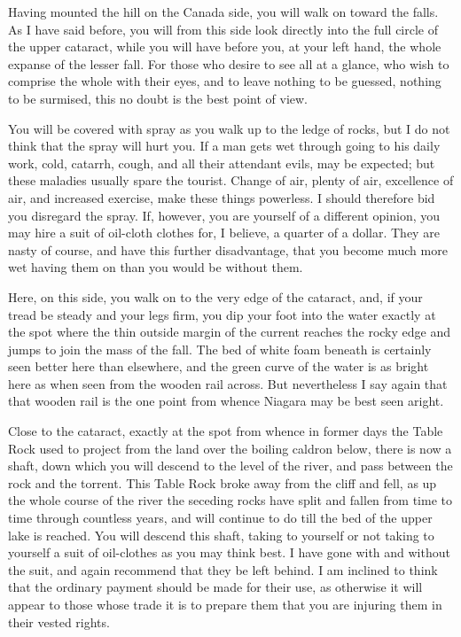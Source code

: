 Having mounted the hill on the Canada side, you will walk on toward
the falls.  As I have said before, you will from this side look
directly into the full circle of the upper cataract, while you will
have before you, at your left hand, the whole expanse of the lesser
fall.  For those who desire to see all at a glance, who wish to
comprise the whole with their eyes, and to leave nothing to be
guessed, nothing to be surmised, this no doubt is the best point of
view.

You will be covered with spray as you walk up to the ledge of
rocks, but I do not think that the spray will hurt you.  If a man
gets wet through going to his daily work, cold, catarrh, cough, and
all their attendant evils, may be expected; but these maladies
usually spare the tourist.  Change of air, plenty of air,
excellence of air, and increased exercise, make these things
powerless.  I should therefore bid you disregard the spray.  If,
however, you are yourself of a different opinion, you may hire a
suit of oil-cloth clothes for, I believe, a quarter of a dollar.
They are nasty of course, and have this further disadvantage, that
you become much more wet having them on than you would be without
them.

Here, on this side, you walk on to the very edge of the cataract,
and, if your tread be steady and your legs firm, you dip your foot
into the water exactly at the spot where the thin outside margin of
the current reaches the rocky edge and jumps to join the mass of
the fall.  The bed of white foam beneath is certainly seen better
here than elsewhere, and the green curve of the water is as bright
here as when seen from the wooden rail across.  But nevertheless I
say again that that wooden rail is the one point from whence
Niagara may be best seen aright.

Close to the cataract, exactly at the spot from whence in former
days the Table Rock used to project from the land over the boiling
caldron below, there is now a shaft, down which you will descend to
the level of the river, and pass between the rock and the torrent.
This Table Rock broke away from the cliff and fell, as up the whole
course of the river the seceding rocks have split and fallen from
time to time through countless years, and will continue to do till
the bed of the upper lake is reached.  You will descend this shaft,
taking to yourself or not taking to yourself a suit of oil-clothes
as you may think best.  I have gone with and without the suit, and
again recommend that they be left behind.  I am inclined to think
that the ordinary payment should be made for their use, as
otherwise it will appear to those whose trade it is to prepare them
that you are injuring them in their vested rights.

